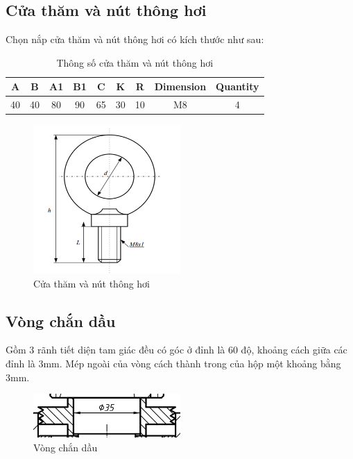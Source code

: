 \subsection{Cửa thăm và nút thông hơi}
Chọn nắp cửa thăm và nút thông hơi có kích thước như sau:
\begin{table}[H]
    \centering
\begin{tabular}{|c|c|c|c|c|c|c|c|c|}
\hline
A & B & A1 & B1 & C & K & R & Dimension & Quantity \\
\hline
40 & 40 & 80 & 90 & 65 & 30 & 10 & M8 & 4 \\
\hline
\end{tabular}
\caption{Thông số cửa thăm và nút thông hơi}
\end{table}
\begin{figure}[H]
    \centering
    \includegraphics[width=0.5\textwidth]{pictures/vitvong.png}
    \caption{Cửa thăm và nút thông hơi}
\end{figure}
\subsection{Vòng chắn dầu}
Gồm 3 rãnh tiết diện tam giác đều có góc ở đỉnh là 60 độ, khoảng cách giữa các đỉnh là 3mm. Mép ngoài của vòng cách thành trong của hộp một khoảng bằng 3mm. 
\begin{figure}[H]
    \centering
    \includegraphics[width=0.5\textwidth]{pictures/vongchandau.png}
    \caption{Vòng chắn dầu}
\end{figure}
